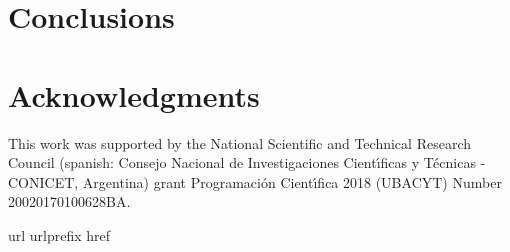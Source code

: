\documentclass[preprint,12pt]{elsarticle}
\begin{document}
\section{\label{conclusions}Conclusions}

\section*{Acknowledgments}
This work was supported by the National Scientific and Technical 
Research Council (spanish: Consejo Nacional de Investigaciones Cient\'\i ficas 
y T\'ecnicas - CONICET, Argentina) grant Programaci\'on Cient\'\i fica 2018 (UBACYT) Number 20020170100628BA.

\appendix



\begin{thebibliography}{10}
\expandafter\ifx\csname url\endcsname\relax
  \def\url#1{\texttt{#1}}\fi
\expandafter\ifx\csname urlprefix\endcsname\relax\def\urlprefix{URL }\fi
\expandafter\ifx\csname href\endcsname\relax
  \def\href#1#2{#2} \def\path#1{#1}\fi


\end{thebibliography}
\end{document}
